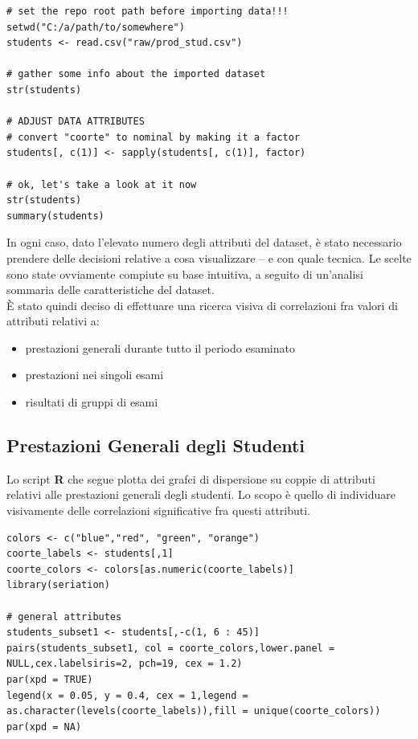 \newpage

\begin{lstlisting}
# set the repo root path before importing data!!!
setwd("C:/a/path/to/somewhere")
students <- read.csv("raw/prod_stud.csv")

# gather some info about the imported dataset
str(students)

# ADJUST DATA ATTRIBUTES 
# convert "coorte" to nominal by making it a factor 
students[, c(1)] <- sapply(students[, c(1)], factor)

# ok, let's take a look at it now
str(students)
summary(students)
\end{lstlisting}

In ogni caso, dato l’elevato numero degli attributi del dataset, è stato necessario prendere delle decisioni relative a cosa visualizzare – e con quale tecnica. Le scelte sono state ovviamente compiute su base intuitiva, a seguito di un’analisi sommaria delle caratteristiche del dataset. \\

È stato quindi deciso di effettuare una ricerca visiva di correlazioni fra valori di attributi relativi a:
\begin{itemize}
    \item prestazioni generali durante tutto il periodo esaminato
    \item prestazioni nei singoli esami
    \item risultati di gruppi di esami
\end{itemize}

\subsection{Prestazioni Generali degli Studenti}

Lo script \textbf{R} che segue plotta dei grafci di dispersione su coppie di attributi relativi alle prestazioni generali degli studenti. Lo scopo è quello di individuare visivamente delle correlazioni significative fra questi attributi.\\

\begin{lstlisting}
colors <- c("blue","red", "green", "orange")
coorte_labels <- students[,1]
coorte_colors <- colors[as.numeric(coorte_labels)]
library(seriation)

# general attributes
students_subset1 <- students[,-c(1, 6 : 45)]
pairs(students_subset1, col = coorte_colors,lower.panel = 	NULL,cex.labelsiris=2, pch=19, cex = 1.2)
par(xpd = TRUE)
legend(x = 0.05, y = 0.4, cex = 1,legend = 	as.character(levels(coorte_labels)),fill = unique(coorte_colors))
par(xpd = NA)
\end{lstlisting}

